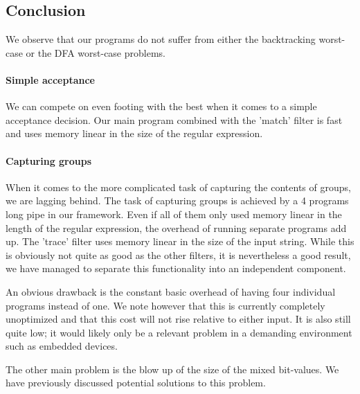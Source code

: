 \subsection{Conclusion}

We observe that our programs do not suffer from either the
backtracking worst-case or the DFA worst-case problems.

\paragraph{Simple acceptance} We can compete on even footing with the
best when it comes to a simple acceptance decision. Our main program
combined with the 'match' filter is fast and uses memory linear in the
size of the regular expression.

\paragraph{Capturing groups} When it comes to the more complicated
task of capturing the contents of groups, we are lagging behind. The
task of capturing groups is achieved by a 4 programs long pipe in our
framework. Even if all of them only used memory linear in the length
of the regular expression, the overhead of running separate programs
add up.  The 'trace' filter uses memory linear in the size of the
input string. While this is obviously not quite as good as the other
filters, it is nevertheless a good result, we have managed to separate
this functionality into an independent component.

An obvious drawback is the constant basic overhead of having four
individual programs instead of one. We note however that this is
currently completely unoptimized and that this cost will not rise
relative to either input. It is also still quite low; it would likely only be a relevant problem in a demanding environment
such as embedded devices.

The other main problem is the blow up of the size of the mixed
bit-values. We have previously discussed potential solutions to this
problem.
